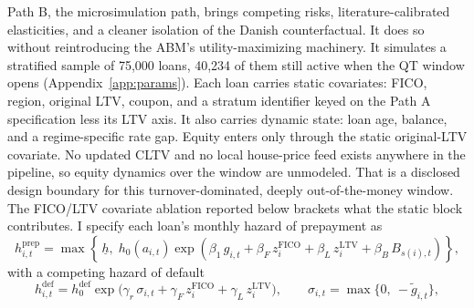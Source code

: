 \documentclass[12pt]{article}
\begin{document}
Path B, the microsimulation path, brings competing risks, literature-calibrated elasticities, and a cleaner isolation of the Danish counterfactual. It does so without reintroducing the ABM's utility-maximizing machinery. It simulates a stratified sample of 75,000 loans, 40,234 of them still active when the QT window opens (Appendix~\ref{app:params}). Each loan carries static covariates: FICO, region, original LTV, coupon, and a stratum identifier keyed on the Path A specification less its LTV axis. It also carries dynamic state: loan age, balance, and a regime-specific rate gap. Equity enters only through the static original-LTV covariate. No updated CLTV and no local house-price feed exists anywhere in the pipeline, so equity dynamics over the window are unmodeled. That is a disclosed design boundary for this turnover-dominated, deeply out-of-the-money window. The FICO/LTV covariate ablation reported below brackets what the static block contributes. I specify each loan's monthly hazard of prepayment as
\begin{equation}\label{eq:pathB}
h^{\mathrm{prep}}_{i,t} = \max\!\left\{\, \underline{h},\; h_0\!\left(a_{i,t}\right) \exp\!\left( \beta_1\, g_{i,t} + \beta_F\, z^{\mathrm{FICO}}_{i} + \beta_L\, z^{\mathrm{LTV}}_{i} + \beta_B\, B_{s(i),t} \right) \right\},
\end{equation}
with a competing hazard of default
\begin{equation}\label{eq:default}
h^{\mathrm{def}}_{i,t} = h^{\mathrm{def}}_0 \exp\!\big( \gamma_r\, \sigma_{i,t} + \gamma_F\, z^{\mathrm{FICO}}_{i} + \gamma_L\, z^{\mathrm{LTV}}_{i} \big), \qquad \sigma_{i,t} = \max\{0,\ -\tilde g_{i,t}\},
\end{equation}
\end{document}
